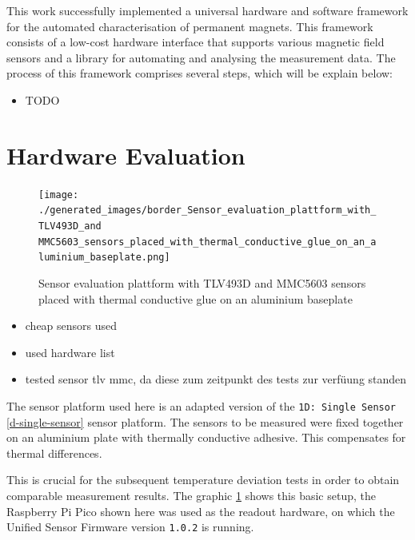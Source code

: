 This work successfully implemented a universal hardware and software
framework for the automated characterisation of permanent magnets. This
framework consists of a low-cost hardware interface that supports
various magnetic field sensors and a library for automating and
analysing the measurement data. The process of this framework comprises
several steps, which will be explain below:

\begin{itemize}
\tightlist
\item
  TODO
\end{itemize}

\hypertarget{hardware-evaluation}{%
\section{Hardware Evaluation}\label{hardware-evaluation}}

\begin{figure}
\centering
\texttt{[image: ./generated\_images/border\_Sensor\_evaluation\_plattform\_with\_TLV493D\_and MMC5603\_sensors\_placed\_with\_thermal\_conductive\_glue\_on\_an\_aluminium\_baseplate.png]}
\caption{Sensor evaluation plattform with TLV493D and MMC5603 sensors
placed with thermal conductive glue on an aluminium baseplate
\label{Sensor_evaluation_plattform_with_TLV493D_and MMC5603_sensors_placed_with_thermal_conductive_glue_on_an_aluminium_baseplate.png}}
\end{figure}

\begin{itemize}
\tightlist
\item
  cheap sensors used
\item
  used hardware list
\item
  tested sensor tlv mmc, da diese zum zeitpunkt des tests zur verfüung
  standen
\end{itemize}

The sensor platform used here is an adapted version of the
\passthrough{\lstinline!1D: Single Sensor!} \ref{d-single-sensor} sensor
platform. The sensors to be measured were fixed together on an aluminium
plate with thermally conductive adhesive. This compensates for thermal
differences.

This is crucial for the subsequent temperature deviation tests in order
to obtain comparable measurement results. The graphic
\ref{Sensor_evaluation_plattform_with_TLV493D_and MMC5603_sensors_placed_with_thermal_conductive_glue_on_an_aluminium_baseplate.png}
shows this basic setup, the Raspberry Pi Pico shown here was used as the
readout hardware, on which the Unified Sensor Firmware version
\passthrough{\lstinline!1.0.2!} is running.

